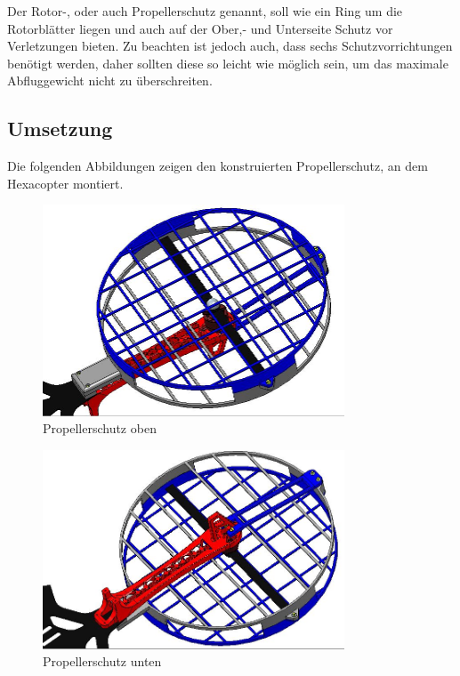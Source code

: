 	Der Rotor-, oder auch Propellerschutz genannt, soll wie ein Ring um die Rotorblätter liegen und auch auf der Ober,- und Unterseite Schutz vor Verletzungen bieten.
	Zu beachten ist jedoch auch, dass sechs Schutzvorrichtungen benötigt werden, daher sollten diese so leicht wie möglich sein, um das maximale Abfluggewicht nicht zu überschreiten.

	\subsection{Umsetzung}

	Die folgenden Abbildungen zeigen den konstruierten Propellerschutz, an dem Hexacopter montiert.

			\begin{figure}[tbh]
			\begin{centering}
			\includegraphics[width = 0.8\textwidth]{Bilder/propellerschutz_gesamt_oben}
			\par\end{centering}
			\caption{Propellerschutz oben}
			\label{propellerschutz_gesamt_oben}
			\end{figure}

			\begin{figure}[H]
			\begin{centering}
			\includegraphics[width = 0.8\textwidth]{Bilder/propellerschutz_gesamt_unten}
			\par\end{centering}
			\caption{Propellerschutz unten}
			\label{propellerschutz_gesamt_unten}
			\end{figure}

